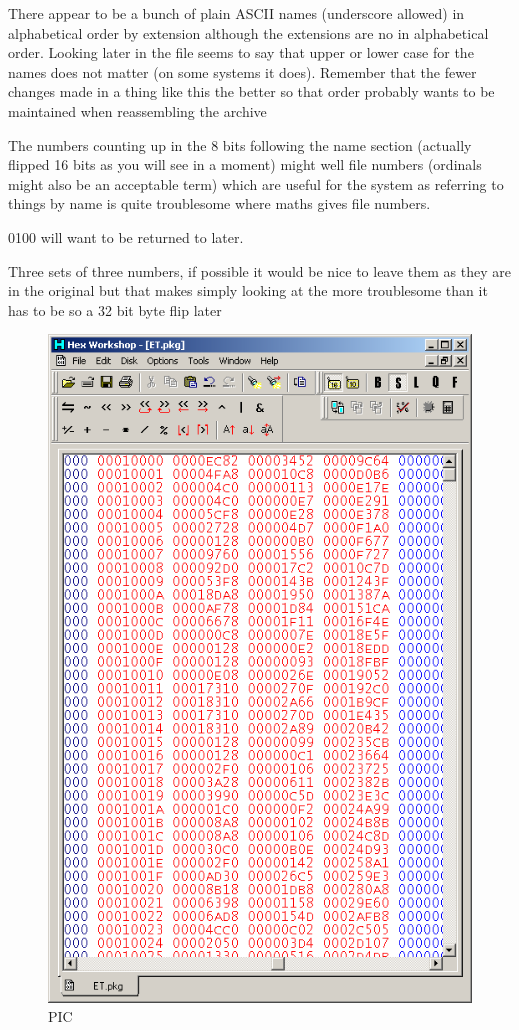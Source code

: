 \documentclass[
]{book}
\begin{document}
There appear to be a bunch of plain ASCII names (underscore allowed) in alphabetical order by extension although the extensions are no in alphabetical order. Looking later in the file seems to say that upper or lower case for the names does not matter (on some systems it does). Remember that the fewer changes made in a thing like this the better so that order probably wants to be maintained when reassembling the archive

The numbers counting up in the 8 bits following the name section (actually flipped 16 bits as you will see in a moment) might well file numbers (ordinals might also be an acceptable term) which are useful for the system as referring to things by name is quite troublesome where maths gives file numbers.

0100 will want to be returned to later.

Three sets of three numbers, if possible it would be nice to leave them as they are in the original but that makes simply looking at the more troublesome than it has to be so a 32 bit byte flip later

\begin{figure}
\centering
\includegraphics{images/129_home_fast6191_romhackingguide_unrenamed_fil___al_borders_romhackingguidearchive_eltigre_3.png}
\caption{PIC}
\end{figure}
\end{document}

